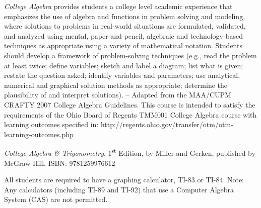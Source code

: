 \documentclass{osucourse}
\begin{document}
\CatalogDescription
\PrerequisitesAndExclusions

\SequencingChart

\begin{Purpose}
\emph{College Algebra} provides students a college level academic experience that emphasizes the use of algebra and functions in problem solving and modeling, where solutions to problems in real-world situations are formulated, validated, and analyzed using mental, paper-and-pencil, algebraic and technology-based techniques as appropriate using a variety of mathematical notation. Students should develop a framework of problem-solving techniques (e.g., read the problem at least twice; define variables; sketch and label a diagram; list what is given; restate the question asked; identify variables and parameters; use analytical, numerical and graphical solution methods as appropriate; determine the plausibility of and interpret solutions). – Adapted from the MAA/CUPM CRAFTY 2007 College Algebra Guidelines. This course is intended to satisfy the requirements of the Ohio Board of Regents TMM001 College Algebra course with learning outcomes specified in: http://regents.ohio.gov/transfer/otm/otm-learning-outcomes.php
\end{Purpose}

\begin{Text}
\emph{College Algebra \& Trigonometry}, 1\textsuperscript{st} Edition, by Miller and Gerken, published by McGraw-Hill. ISBN: 9781259976612
\end{Text}

\begin{Technology}
All students are required to have a graphing calculator, TI-83 or TI-84. Note: Any calculators (including TI-89 and TI-92) that use a Computer Algebra System (CAS) are not permitted.
\end{Technology}
\end{document}

